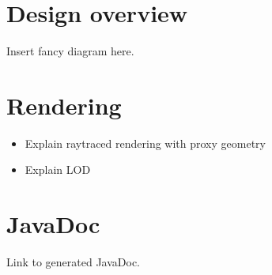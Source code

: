 \documentclass{scrreprt}
\begin{document}
\section{Design overview}

Insert fancy diagram here.

\section{Rendering}

\begin{itemize}
\item Explain raytraced rendering with proxy geometry
\item Explain LOD
\end{itemize}

\section{JavaDoc}

Link to generated JavaDoc.
\end{document}
